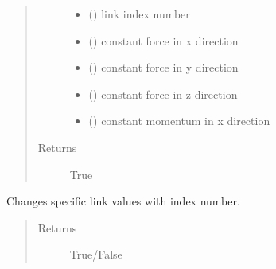 \documentclass[letterpaper,10pt,english]{sphinxmanual}
\begin{document}
\begin{fulllineitems}
\begin{fulllineitems}
\begin{quote}
\begin{description}
\begin{itemize}
\item {} 
 () \textendash{} link index number

\item {} 
 () \textendash{} constant force in x direction

\item {} 
 () \textendash{} constant force in y direction

\item {} 
 () \textendash{} constant force in z direction

\item {} 
 () \textendash{} constant momentum in x direction

\end{itemize}

\item[{Returns}] \leavevmode
True

\end{description}\end{quote}

\end{fulllineitems}


\begin{fulllineitems}
\label{\detokenize{api:beamon.database.Database.change_link}}
Changes specific link values with index number.
\begin{quote}\begin{description}
\item[{Returns}] \leavevmode
True/False


\end{description}
\end{quote}
\end{fulllineitems}
\end{fulllineitems}
\end{document}

